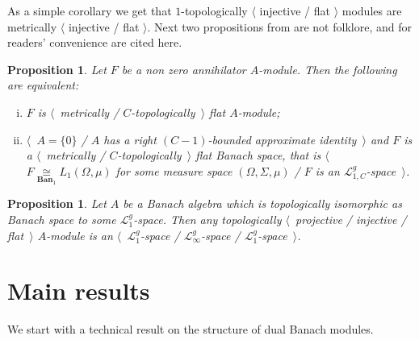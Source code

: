 \documentclass[12pt]{article}
\newtheorem{proposition}[theorem]{Proposition}
\newcommand{\isom}[1]{\mathop{\mathbin{\cong}}\limits_{#1}}
\begin{document}
As a simple corollary we get that $1$-topologically $\langle$ injective / flat $\rangle$ modules are metrically $\langle$ injective / flat $\rangle$.  Next two propositions from \cite{NemGeomProjInjFlatBanMod} are not folklore, and for readers' convenience are cited here.
\begin{proposition}\label{MetTopFlatAnnihModCharac} Let $F$ be a non zero annihilator $A$-module. Then the following are equivalent:
\begin{enumerate}[i)]
\item $F$ is $\langle$~metrically / $C$-topologically~$\rangle$ flat $A$-module;
\item $\langle$~$A=\{0\}$ / $A$ has a right $(C-1)$-bounded approximate identity~$\rangle$ and $F$ is a $\langle$~metrically / $C$-topologically~$\rangle$ flat Banach space, that is $\langle$~$F\isom{\mathbf{Ban}_1}L_1(\Omega,\mu)$ for some measure space $(\Omega, \Sigma, \mu)$ / $F$ is an $\mathcal{L}_{1,C}^g$-space~$\rangle$.
\end{enumerate}
\end{proposition}

\begin{proposition}\label{TopProjInjFlatModOverMthscrL1SpCharac} Let $A$ be a Banach algebra which is topologically isomorphic as Banach space to some $\mathcal{L}_1^g$-space. Then any topologically $\langle$~projective / injective / flat~$\rangle$ $A$-module is an $\langle$~$\mathcal{L}_1^g$-space / $\mathcal{L}_\infty^g$-space / $\mathcal{L}_1^g$-space~$\rangle$.
\end{proposition}


\section{Main results}
\label{SectionMainResults}

We start with a technical result on the structure of dual Banach modules.
\end{document}
